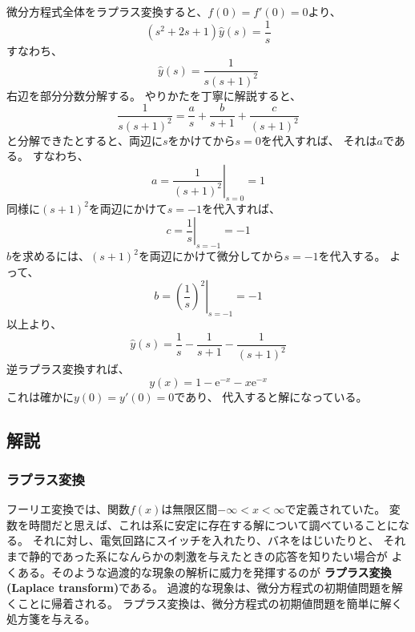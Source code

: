 \documentclass{jarticle}
\newcommand{\e}{\mathrm e}
\begin{document}
微分方程式全体をラプラス変換すると、$f(0)=f'(0)=0$より、
\begin{equation}
  (s^2 + 2s +1) \hat{y}(s) = \frac{1}{s}
\end{equation}
すなわち、
\begin{equation}
  \hat{y}(s) = \frac{1}{s(s+1)^2}
\end{equation}
右辺を部分分数分解する。
やりかたを丁寧に解説すると、
\begin{equation}
  \frac{1}{s(s+1)^2} = \frac{a}{s} + \frac{b}{s+1} + \frac{c}{(s+1)^2}
\end{equation}
と分解できたとすると、両辺に$s$をかけてから$s=0$を代入すれば、
それは$a$である。
すなわち、
\begin{equation}
  a = \left. \frac{1}{(s+1)^2}\right|_{s=0} = 1
\end{equation}
同様に$(s+1)^2$を両辺にかけて$s=-1$を代入すれば、
\begin{equation}
  c = \left. \frac{1}{s}\right|_{s=-1} = -1
\end{equation}
$b$を求めるには、$(s+1)^2$を両辺にかけて微分してから$s=-1$を代入する。
よって、
\begin{equation}
  b = \left. \left(\frac{1}{s}\right)^2 \right|_{s=-1} = -1
\end{equation}
以上より、
\begin{equation}
  \hat{y}(s) =  \frac{1}{s} - \frac{1}{s+1} - \frac{1}{(s+1)^2}
\end{equation}
逆ラプラス変換すれば、
\begin{equation}
  y(x) =  1 - \e^{-x} - x\e^{-x}
\end{equation}
これは確かに$y(0)=y'(0) = 0$であり、
代入すると解になっている。


\subsection{解説}

\subsubsection{ラプラス変換}

フーリエ変換では、関数$f(x)$は無限区間$-\infty < x < \infty$で定義されていた。
変数を時間だと思えば、これは系に安定に存在する解について調べていることになる。
それに対し、電気回路にスイッチを入れたり、バネをはじいたりと、
それまで静的であった系になんらかの刺激を与えたときの応答を知りたい場合が
よくある。そのような過渡的な現象の解析に威力を発揮するのが
{\bf ラプラス変換 (Laplace transform)}である。
過渡的な現象は、微分方程式の初期値問題を解くことに帰着される。
ラプラス変換は、微分方程式の初期値問題を簡単に解く処方箋を与える。
\end{document}

